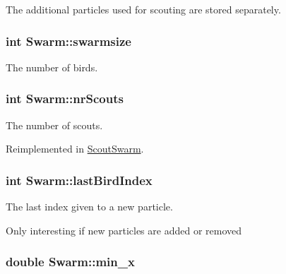 The additional particles used for scouting are stored separately. 

\hypertarget{classSwarm_0ed97963cfeb4f2b8eee5c4fb6f6dcde}{
\subsubsection{\setlength{\rightskip}{0pt plus 5cm}int {\bf Swarm::swarmsize}}}
\label{classSwarm_0ed97963cfeb4f2b8eee5c4fb6f6dcde}


The number of birds. 

\hypertarget{classSwarm_6ec8b4463d83af484788490c203ae166}{
\subsubsection{\setlength{\rightskip}{0pt plus 5cm}int {\bf Swarm::nrScouts}}}
\label{classSwarm_6ec8b4463d83af484788490c203ae166}


The number of scouts. 



Reimplemented in \hyperlink{classScoutSwarm_7a55b74b3e6528d7f16ac9a65357d43c}{ScoutSwarm}.\hypertarget{classSwarm_9e9e482ef70387a81721eb5e2b998725}{
\subsubsection{\setlength{\rightskip}{0pt plus 5cm}int {\bf Swarm::lastBirdIndex}}}
\label{classSwarm_9e9e482ef70387a81721eb5e2b998725}


The last index given to a new particle. 

Only interesting if new particles are added or removed \hypertarget{classSwarm_b504e23c39413573e3685a88435f5f85}{
\subsubsection{\setlength{\rightskip}{0pt plus 5cm}double {\bf Swarm::min\_\-x}}}
\label{classSwarm_b504e23c39413573e3685a88435f5f85}


